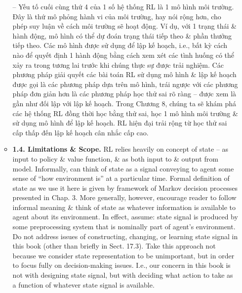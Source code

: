 \documentclass{article}
\begin{document}
\begin{itemize}
\begin{itemize}
        -- Yếu tố cuối cùng thứ 4 của 1 số hệ thống RL là 1 mô hình môi trường. Đây là thứ mô phỏng hành vi của môi trường, hay nói rộng hơn, cho phép suy luận về cách môi trường sẽ hoạt động. Ví dụ, với 1 trạng thái \& hành động, mô hình có thể dự đoán trạng thái tiếp theo \& phần thưởng tiếp theo. Các mô hình được sử dụng để lập kế hoạch, i.e., bất kỳ cách nào để quyết định 1 hành động bằng cách xem xét các tình huống có thể xảy ra trong tương lai trước khi chúng thực sự được trải nghiệm. Các phương pháp giải quyết các bài toán RL sử dụng mô hình \& lập kế hoạch được gọi là các phương pháp dựa trên mô hình, trái ngược với các phương pháp đơn giản hơn là các phương pháp học thử sai rõ ràng -- được xem là gần như đối lập với lập kế hoạch. Trong Chương 8, chúng ta sẽ khám phá các hệ thống RL đồng thời học bằng thử sai, học 1 mô hình môi trường \& sử dụng mô hình để lập kế hoạch. RL hiện đại trải rộng từ học thử sai cấp thấp đến lập kế hoạch cân nhắc cấp cao.
        \item {\bf1.4. Limitations \& Scope.} RL relies heavily on concept of state -- as input to policy \& value function, \& as both input to \& output from model. Informally, can think of state as a signal conveying to agent some sense of ``how environment is'' at a particular time. Formal definition of state as we use it here is given by framework of Markov decision processes presented in Chap. 3. More generally, however, encourage reader to follow informal meaning \& think of state as whatever information is available to agent about its environment. In effect, assume: state signal is produced by some preprocessing system that is nominally part of agent's environment. Do not address issues of constructing, changing, or learning state signal in this book (other than briefly in Sect. 17.3). Take this approach not because we consider state representation to be unimportant, but in order to focus fully on decision-making issues. I.e., our concern in this book is not with designing state signal, but with deciding what action to take as a function of whatever state signal is available.


\end{itemize}
\end{itemize}
\end{document}
